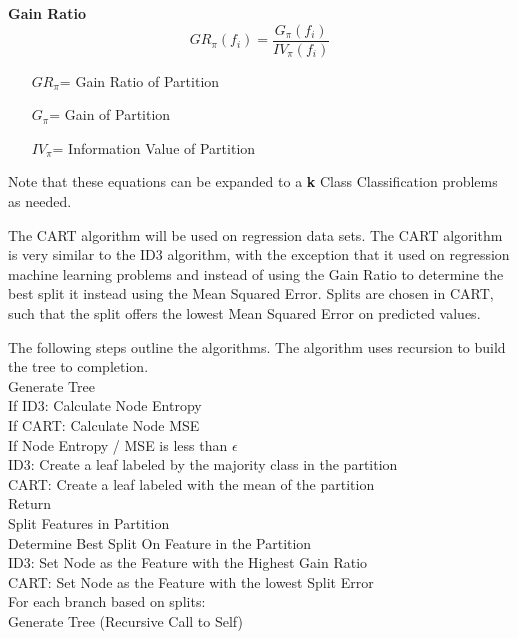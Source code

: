 \documentclass[twoside,11pt]{article}
\newcommand\tab[1][1cm]{\hspace*{#1}}
\begin{document}
\textbf{Gain Ratio}
\begin{equation}
	GR_\pi(f_i)  = \frac{G_\pi(f_i)}{IV_\pi(f_i)}
\end{equation}
\begin{itemize}
	\item[$GR_\pi$=] Gain Ratio of Partition
	\item[$G_\pi$=] Gain of Partition
	\item[$IV_\pi$=] Information Value of Partition
\end{itemize}

Note that these equations can be expanded to a \textbf{k} Class Classification problems as needed. 
\newpage

The CART algorithm will be used on regression data sets. The CART algorithm is very similar to the ID3 algorithm, with the exception that it used on regression machine learning problems and instead of using the Gain Ratio to determine the best split it instead using the Mean Squared Error. Splits are chosen in CART, such that the split offers the lowest Mean Squared Error on predicted values. 

The following steps outline the algorithms. The algorithm uses recursion to build the tree to completion.\\
\newline
Generate Tree\\
If ID3: Calculate Node Entropy\\
If CART: Calculate Node MSE\\
If Node Entropy / MSE is less than $\epsilon$\\
\tab ID3: Create a leaf labeled by the majority class in the partition\\
\tab CART: Create a leaf labeled with the mean of the partition\\
\tab Return\\
Split Features in Partition\\
Determine Best Split On Feature in the Partition\\
\tab ID3: Set Node as the Feature with the Highest Gain Ratio\\
\tab CART: Set Node as the Feature with the lowest Split Error\\ 
For each branch based on splits:\\
Generate Tree (Recursive Call to Self)\\
\newline
\end{document}
